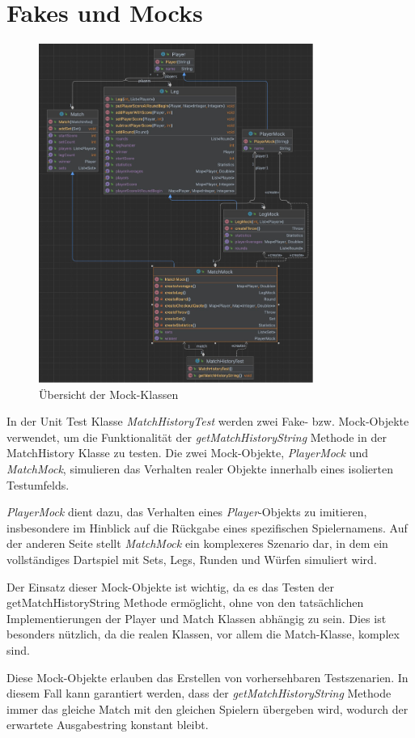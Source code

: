 \section{Fakes und Mocks}
\begin{figure}[ht]
    \centering
    \includegraphics[width=0.8\textwidth]{Bilder/MockOverview.png}
    \caption{Übersicht der Mock-Klassen}
    \label{fig:mock}
\end{figure}
In der Unit Test Klasse \textit{MatchHistoryTest} werden zwei Fake- bzw. Mock-Objekte verwendet, um die Funktionalität der \textit{getMatchHistoryString} Methode in der MatchHistory Klasse zu testen. Die zwei Mock-Objekte, \textit{PlayerMock} und \textit{MatchMock}, simulieren das Verhalten realer Objekte innerhalb eines isolierten Testumfelds.

\textit{PlayerMock} dient dazu, das Verhalten eines \textit{Player}-Objekts zu imitieren, insbesondere im Hinblick auf die Rückgabe eines spezifischen Spielernamens. Auf der anderen Seite stellt \textit{MatchMock} ein komplexeres Szenario dar, in dem ein vollständiges Dartspiel mit Sets, Legs, Runden und Würfen simuliert wird.

Der Einsatz dieser Mock-Objekte ist wichtig, da es das Testen der getMatchHistoryString Methode ermöglicht, ohne von den tatsächlichen Implementierungen der Player und Match Klassen abhängig zu sein. Dies ist besonders nützlich, da die realen Klassen, vor allem die Match-Klasse, komplex sind.

Diese Mock-Objekte erlauben das Erstellen von vorhersehbaren Testszenarien. In diesem Fall kann garantiert werden, dass der \textit{getMatchHistoryString} Methode immer das gleiche Match mit den gleichen Spielern übergeben wird, wodurch der erwartete Ausgabestring konstant bleibt.